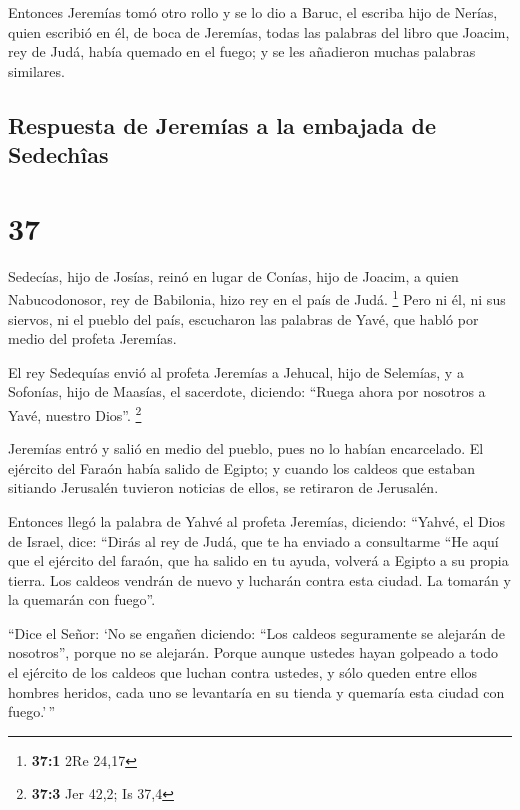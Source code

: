  Entonces Jeremías tomó otro rollo y se lo dio a Baruc,
el escriba hijo de Nerías, quien escribió en él, de boca de Jeremías,
todas las palabras del libro que Joacim, rey de Judá, había quemado en
el fuego; y se les añadieron muchas palabras similares.

\hypertarget{respuesta-de-jeremuxedas-a-la-embajada-de-sedechuxeeas}{%
\subsection{Respuesta de Jeremías a la embajada de
Sedechîas}\label{respuesta-de-jeremuxedas-a-la-embajada-de-sedechuxeeas}}

\hypertarget{section-36}{%
\section{37}\label{section-36}}

 Sedecías, hijo de Josías, reinó en lugar de Conías, hijo
de Joacim, a quien Nabucodonosor, rey de Babilonia, hizo rey en el país
de Judá. \footnote{\textbf{37:1} 2Re 24,17}  Pero ni él,
ni sus siervos, ni el pueblo del país, escucharon las palabras de Yavé,
que habló por medio del profeta Jeremías.

 El rey Sedequías envió al profeta Jeremías a Jehucal,
hijo de Selemías, y a Sofonías, hijo de Maasías, el sacerdote, diciendo:
``Ruega ahora por nosotros a Yavé, nuestro Dios''. \footnote{\textbf{37:3}
  Jer 42,2; Is 37,4}

 Jeremías entró y salió en medio del pueblo, pues no lo
habían encarcelado.  El ejército del Faraón había salido
de Egipto; y cuando los caldeos que estaban sitiando Jerusalén tuvieron
noticias de ellos, se retiraron de Jerusalén.

 Entonces llegó la palabra de Yahvé al profeta Jeremías,
diciendo:  ``Yahvé, el Dios de Israel, dice: ``Dirás al
rey de Judá, que te ha enviado a consultarme ``He aquí que el ejército
del faraón, que ha salido en tu ayuda, volverá a Egipto a su propia
tierra.  Los caldeos vendrán de nuevo y lucharán contra
esta ciudad. La tomarán y la quemarán con fuego''.

 ``Dice el Señor: `No se engañen diciendo: ``Los caldeos
seguramente se alejarán de nosotros'', porque no se alejarán.
 Porque aunque ustedes hayan golpeado a todo el ejército
de los caldeos que luchan contra ustedes, y sólo queden entre ellos
hombres heridos, cada uno se levantaría en su tienda y quemaría esta
ciudad con fuego.'\,''

